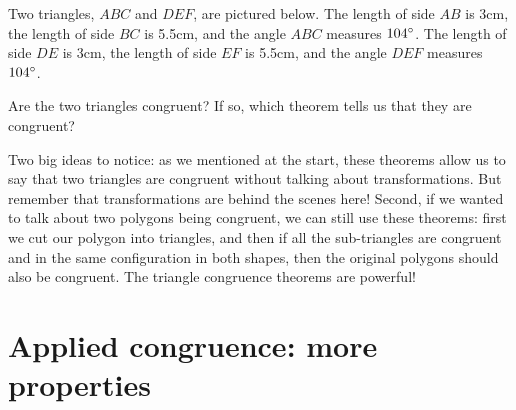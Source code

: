 \documentclass{ximera}
\begin{document}
\begin{example} 
Two triangles, $ABC$ and $DEF$, are pictured below. The length of side $AB$ is 3cm, the length of side $BC$ is 5.5cm, and the angle $ABC$ measures $104\degree$.  The length of side $DE$ is 3cm, the length of side $EF$ is 5.5cm, and the angle $DEF$ measures $104\degree$.
\begin{center} \end{center}
Are the two triangles congruent? If so, which theorem tells us that they are congruent?
\begin{multipleChoice}
\end{multipleChoice}
\end{example}

Two big ideas to notice: as we mentioned at the start, these theorems allow us to say that two triangles are congruent without talking about transformations. But remember that transformations are behind the scenes here! Second, if we wanted to talk about two polygons being congruent, we can still use these theorems: first we cut our polygon into triangles, and then if all the sub-triangles are congruent and in the same configuration in both shapes, then the original polygons should also be congruent. The triangle congruence theorems are powerful!




\section{Applied congruence: more properties}
\end{document}
